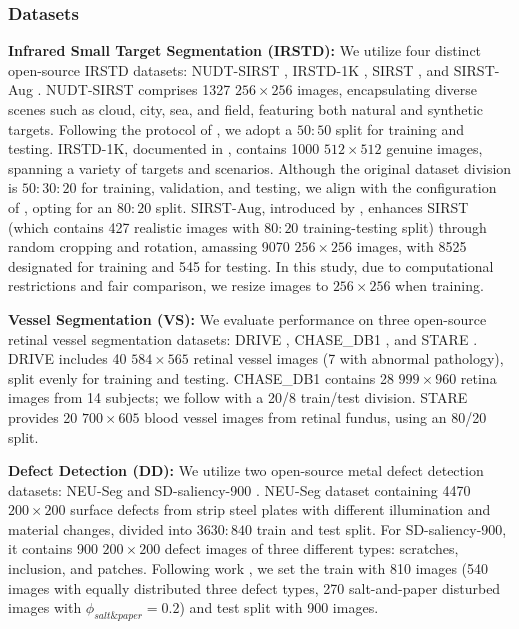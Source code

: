 \documentclass[10pt,journal,compsoc]{IEEEtran}
\begin{document}
\subsubsection{Datasets}
\noindent \textbf{Infrared Small Target Segmentation (IRSTD):} We utilize four distinct open-source IRSTD datasets: NUDT-SIRST \cite{li-2023-dnanet}, IRSTD-1K \cite{zhang-2022-isnet},  SIRST \cite{dai-2021-acm}, and SIRST-Aug \cite{zhang-2023-agpc}. NUDT-SIRST comprises 1327 \(256 \times 256\) images, encapsulating diverse scenes such as cloud, city, sea, and field, featuring both natural and synthetic targets. Following the protocol of \cite{li-2023-dnanet}, we adopt a \(50:50\) split for training and testing. IRSTD-1K, documented in \cite{zhang-2022-isnet}, contains 1000 \(512 \times 512\) genuine images, spanning a variety of targets and scenarios. Although the original dataset division is \(50:30:20\) for training, validation, and testing, we align with the configuration of \cite{ying-2023-lesps}, opting for an \(80:20\) split. SIRST-Aug, introduced by \cite{zhang-2023-agpc}, enhances  SIRST \cite{dai-2021-acm} (which contains 427 realistic images with \(80:20\) training-testing split) through random cropping and rotation, amassing 9070 \(256 \times 256\) images, with 8525 designated for training and 545 for testing. In this study, due to computational restrictions and fair comparison, we resize images to \(256\times256\) when training.

\noindent\textbf{Vessel Segmentation (VS):} We evaluate performance on three open-source retinal vessel segmentation datasets: DRIVE \cite{staal-2004-drive}, CHASE\_DB1 \cite{fraz-2012-chasedb1}, and STARE \cite{hoover-2000-stare}. DRIVE includes 40 $584\times565$ retinal vessel images (7 with abnormal pathology), split evenly for training and testing. CHASE\_DB1 contains 28 $999\times960$ retina images from 14 subjects; we follow \cite{liu-2022-frunet} with a 20/8 train/test division. STARE provides 20 $700\times605$ blood vessel images from retinal fundus, using an 80/20 split.


\noindent \textbf{Defect Detection (DD):} We utilize two open-source metal defect detection datasets: NEU-Seg \cite{dong-2019-neuseg} and SD-saliency-900 \cite{song-2020-MCITF}. NEU-Seg dataset containing 4470 $200\times 200$ surface defects from strip steel plates with different illumination and material changes, divided into \(3630:840\) train and test split. For SD-saliency-900, it contains 900 $200\times 200$ defect images of three different types: scratches, inclusion, and patches. Following work \cite{song-2020-edrnet}, we set the train with 810 images (540 images with equally distributed three defect types, 270 salt-and-paper disturbed images with $\phi_{salt\&paper}\!=\!0.2$) and test split with 900 images.
\end{document}
